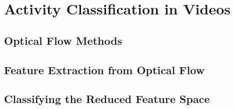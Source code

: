 \chapter{Activity Classification in Videos}
\section{\label{section:optical_flow_methods}Optical Flow Methods}
\section{\label{section:feature_extraction}Feature Extraction from Optical Flow}
\section{\label{section:classification}Classifying the Reduced Feature Space}
